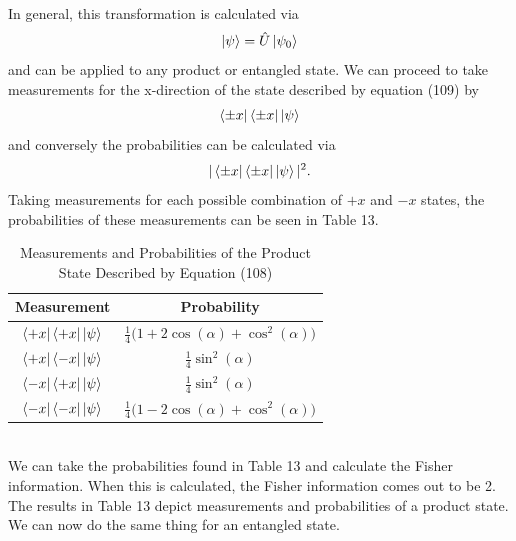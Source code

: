 \documentclass[twocolumn]{article}
\begin{document}
In general, this transformation is calculated via
\begin{equation}
\ket{\psi}=\hat{U}\ket{\psi_0}
\end{equation}
and can be applied to any product or entangled state. We can proceed to take measurements for the x-direction of the state described by equation (109) by
\begin{equation}
\bra{\pm x}\bra{\pm x}\ket{\psi}
\end{equation}
and conversely the probabilities can be calculated via
\begin{equation}
|\bra{\pm x}\bra{\pm x}\ket{\psi}|^2.
\end{equation}
Taking measurements for each possible combination of $+x$ and $-x$ states, the probabilities of these measurements can be seen in Table 13.
\begin{table}[h!]
\begin{center}
\begin{tabular}{ |c|c| }
\hline Measurement & Probability \\
\hline $\bra{+x}\bra{+x}\ket{\psi}$ & $\frac{1}{4}\big(1+2\cos{(\alpha)}+\cos^2{(\alpha)}\big)$ \\
\hline $\bra{+x}\bra{-x}\ket{\psi}$ & $\frac{1}{4}\sin^2{(\alpha)}$ \\
\hline $\bra{-x}\bra{+x}\ket{\psi}$ & $\frac{1}{4}\sin^2{(\alpha)}$ \\
\hline $\bra{-x}\bra{-x}\ket{\psi}$ & $\frac{1}{4}\big(1-2\cos{(\alpha)}+\cos^2{(\alpha)}\big)$ \\
\hline
\end{tabular}
\caption{Measurements and Probabilities of the Product State Described by Equation (108)}
\end{center}
\end{table} \\
We can take the probabilities found in Table 13 and calculate the Fisher information. When this is calculated, the Fisher information comes out to be 2. The results in Table 13 depict measurements and probabilities of a product state. We can now do the same thing for an entangled state.
\end{document}
